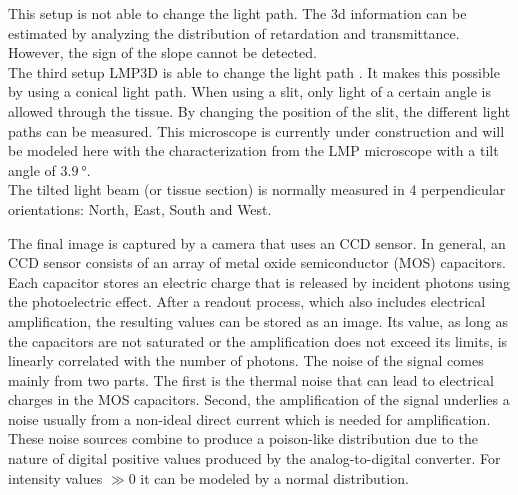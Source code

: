 This setup is not able to change the light path.
The 3d information can be estimated by analyzing the distribution of retardation and transmittance.
However, the sign of the slope cannot be detected.
\\
% 
The third setup \ac{LMP3D} is able to change the light path \cite{Wiese:887678}.
It makes this possible by using a conical light path.
When using a slit, only light of a certain angle is allowed through the tissue.
By changing the position of the slit, the different light paths can be measured.
This microscope is currently under construction and will be modeled here with the characterization from the \ac{LMP} microscope with a tilt angle of $\SI{3.9}{\degree}$.
\\
%
The tilted light beam (or tissue section) is normally measured in 4 perpendicular orientations: North, East, South and West.
\par
%
The final image is captured by a camera that uses an \ac{CCD} sensor.
In general, an \ac{CCD} sensor consists of an array of metal oxide semiconductor (MOS) capacitors.
Each capacitor stores an electric charge that is released by incident photons using the photoelectric effect.
After a readout process, which also includes electrical amplification, the resulting values can be stored as an image.
Its value, as long as the capacitors are not saturated or the amplification does not exceed its limits, is linearly correlated with the number of photons.
The noise of the signal comes mainly from two parts.
The first is the thermal noise that can lead to electrical charges in the MOS capacitors.
Second, the amplification of the signal underlies a noise usually from a non-ideal direct current which is needed for amplification.
These noise sources combine to produce a poison-like distribution due to the nature of digital positive values produced by the analog-to-digital converter.
For intensity values $\gg 0$ it can be modeled by a normal distribution.
%
%
%
